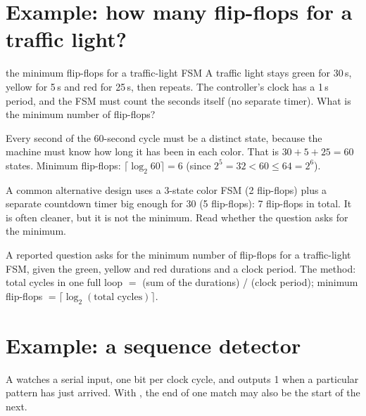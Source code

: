 \section{Example: how many flip-flops for a traffic light?}

\begin{worked}{the minimum flip-flops for a traffic-light FSM}
A traffic light stays green for 30\,s, yellow for 5\,s and red for 25\,s, then repeats. The controller's clock has a 1\,s period, and the FSM must count the seconds itself (no separate timer). What is the minimum number of flip-flops?

Every second of the 60-second cycle must be a distinct state, because the machine must know how long it has been in each color. That is $30 + 5 + 25 = 60$ states. Minimum flip-flops: $\lceil \log_2 60 \rceil = 6$ (since $2^5 = 32 < 60 \le 64 = 2^6$).
\end{worked}

A common alternative design uses a 3-state color FSM (2 flip-flops) plus a separate countdown timer big enough for 30 (5 flip-flops): 7 flip-flops in total. It is often cleaner, but it is not the minimum. Read whether the question asks for the minimum.

\begin{onoa}
A reported question asks for the minimum number of flip-flops for a traffic-light FSM, given the green, yellow and red durations and a clock period. The method: total cycles in one full loop $=$ (sum of the durations) / (clock period); minimum flip-flops $= \lceil \log_2(\text{total cycles}) \rceil$.
\end{onoa}

\section{Example: a sequence detector}

A  watches a serial input, one bit per clock cycle, and outputs 1 when a particular pattern has just arrived. With , the end of one match may also be the start of the next.

